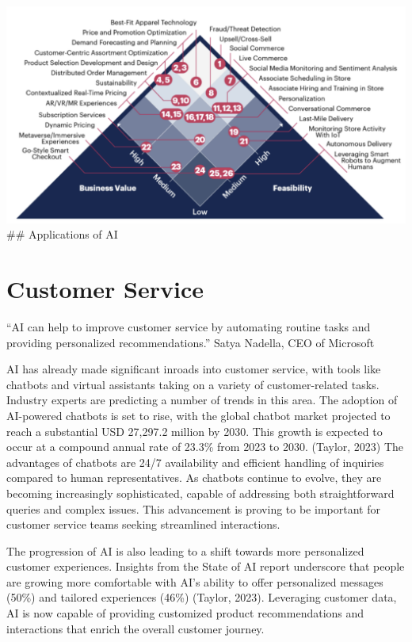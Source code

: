 \documentclass[
]{book}
\begin{document}
\includegraphics{images/retailimage.png}
\#\# Applications of AI

\hypertarget{customer-service}{%
\section{Customer Service}\label{customer-service}}

``AI can help to improve customer service by automating routine tasks and providing personalized recommendations.''
Satya Nadella, CEO of Microsoft

AI has already made significant inroads into customer service, with tools like chatbots and virtual assistants taking on a variety of customer-related tasks. Industry experts are predicting a number of trends in this area. The adoption of AI-powered chatbots is set to rise, with the global chatbot market projected to reach a substantial USD 27,297.2 million by 2030. This growth is expected to occur at a compound annual rate of 23.3\% from 2023 to 2030. (Taylor, 2023) The advantages of chatbots are 24/7 availability and efficient handling of inquiries compared to human representatives. As chatbots continue to evolve, they are becoming increasingly sophisticated, capable of addressing both straightforward queries and complex issues. This advancement is proving to be important for customer service teams seeking streamlined interactions.

The progression of AI is also leading to a shift towards more personalized customer experiences. Insights from the State of AI report underscore that people are growing more comfortable with AI's ability to offer personalized messages (50\%) and tailored experiences (46\%) (Taylor, 2023). Leveraging customer data, AI is now capable of providing customized product recommendations and interactions that enrich the overall customer journey.
\end{document}
